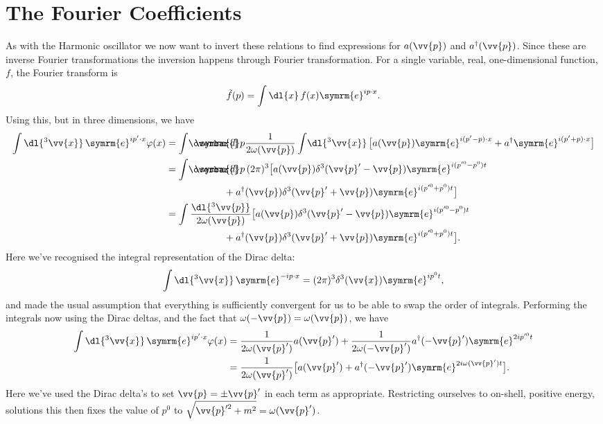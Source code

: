 \documentclass[fleqn]{NotesClass}
\newcommand{\e}{\symrm{e}}
\newcommand{\hermit}{{\dagger}}
\newcommand\dbar{\ThisStyle{\ensurestackMath{%
            \stackengine{-.3\LMpt}{\SavedStyle \symrm{d}}{\SavedStyle\overbar{}%
                \mkern2.25mu}{O}{r}{F}{F}{L}}}}
\newcommand{\invariantmeasure}[1]{\dbar #1}
\begin{document}
    \section{The Fourier Coefficients}
    As with the Harmonic oscillator we now want to invert these relations to find expressions for \(a(\vv{p})\) and \(a^\hermit(\vv{p})\).
    Since these are inverse Fourier transformations the inversion happens through Fourier transformation.
    For a single variable, real, one-dimensional function, \(f\), the Fourier transform is
    \begin{equation}
        \tilde{f}(p) = \int \dl{x} \, f(x) \e^{ip \cdot x}.
    \end{equation}
    Using this, but in three dimensions, we have
    \begin{align*}
        \int \dl{^3\vv{x}} \, \e^{ip' \cdot x} \varphi(x) &= \int \! \invariantmeasure{p} \frac{1}{2\omega(\vv{p})} \int \! \dl{^3\vv{x}} \, \big[a(\vv{p}) \e^{i(p' - p) \cdot x} + a^\hermit \e^{i(p' + p)\cdot x}\big]\\
        &= \int \! \invariantmeasure{p} \, (2\pi)^3 \big[a(\vv{p}) \delta^3(\vv{p}' - \vv{p})\e^{i(p'^0 - p^0)t}\\
        &\qquad\qquad\qquad+ a^\hermit(\vv{p}) \delta^3(\vv{p}' + \vv{p})\e^{i(p'^0 + p^0)t} \big]\\
        &= \int \frac{\dl{^3\vv{p}}}{2\omega(\vv{p})} \big[a(\vv{p}) \delta^3(\vv{p}' - \vv{p})\e^{i(p'^0 - p^0)t}\\
        &\qquad\qquad\qquad+ a^\hermit(\vv{p}) \delta^3(\vv{p}' + \vv{p})\e^{i(p'^0 + p^0)t}\big].
    \end{align*}
    Here we've recognised the integral representation of the Dirac delta:
    \begin{equation}
        \int \dl{^3\vv{x}} \, \e^{-ip\cdot x} = (2\pi)^3 \delta^3(\vv{x}) \e^{ip^0t},
    \end{equation}
    and made the usual assumption that everything is sufficiently convergent for us to be able to swap the order of integrals.
    Performing the integrals now using the Dirac deltas, and the fact that \(\omega(-\vv{p}) = \omega(\vv{p})\), we have
    \begin{align}
        \int \dl{^3\vv{x}} \, \e^{ip' \cdot x} \varphi(x) &= \frac{1}{2\omega(\vv{p}')}a(\vv{p}') + \frac{1}{2\omega(-\vv{p}')} a^\hermit(-\vv{p}') \e^{2ip'^0t}\\
        &= \frac{1}{2\omega(\vv{p}')} \big[a(\vv{p}') + a^\hermit(-\vv{p}') \e^{2i\omega(\vv{p}')t}\big].
    \end{align}
    Here we've used the Dirac delta's to set \(\vv{p} = \pm\vv{p}'\) in each term as appropriate.
    Restricting ourselves to on-shell, positive energy, solutions this then fixes the value of \(p^0\) to \(\sqrt{\vv{p}'^2 + m^2} = \omega(\vv{p}')\).
    
\end{document}
